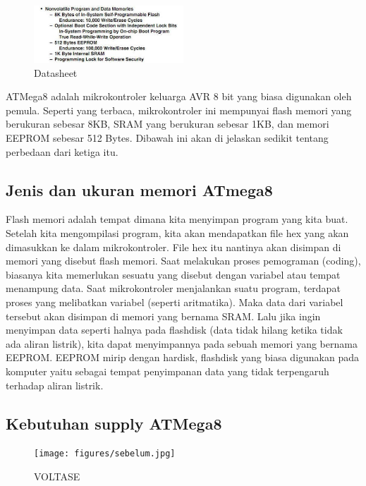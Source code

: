		\begin{figure}[ht]
			\centerline{\includegraphics[width=0.5\textwidth]{figures/datamemori.jpg}}
			\caption{Datasheet}
			\label{datamemori}
			\end{figure}
			
		ATMega8 adalah mikrokontroler keluarga AVR 8 bit yang biasa digunakan oleh pemula. Seperti yang terbaca, mikrokontroler ini mempunyai flash memori yang berukuran sebesar 8KB, SRAM yang berukuran sebesar 1KB, dan memori EEPROM sebesar 512 Bytes. Dibawah ini akan di jelaskan sedikit tentang perbedaan dari ketiga itu.
	\subsection{Jenis dan ukuran memori ATmega8}
		Flash memori adalah tempat dimana kita  menyimpan program yang kita buat. Setelah kita mengompilasi program, kita akan mendapatkan file hex yang akan dimasukkan ke dalam  mikrokontroler. File hex itu nantinya akan disimpan di memori yang disebut flash memori. Saat melakukan proses pemograman (coding), biasanya kita memerlukan sesuatu yang disebut dengan variabel atau tempat menampung data.
		Saat mikrokontroler menjalankan suatu program, terdapat proses yang melibatkan variabel (seperti aritmatika). Maka data dari variabel tersebut akan disimpan di memori yang bernama SRAM. Lalu jika ingin menyimpan data seperti halnya pada flashdisk (data tidak hilang ketika tidak ada aliran listrik), kita dapat menyimpannya pada sebuah memori yang bernama EEPROM. EEPROM mirip dengan hardisk, flashdisk yang biasa digunakan pada komputer yaitu sebagai tempat penyimpanan data yang tidak terpengaruh terhadap aliran listrik.
	\subsection{Kebutuhan supply ATMega8}
	
		\begin{figure}[ht]
			\centerline{\texttt{[image: figures/sebelum.jpg]}}
			\caption{VOLTASE}
			\label{voltase}
			\end{figure}
			

